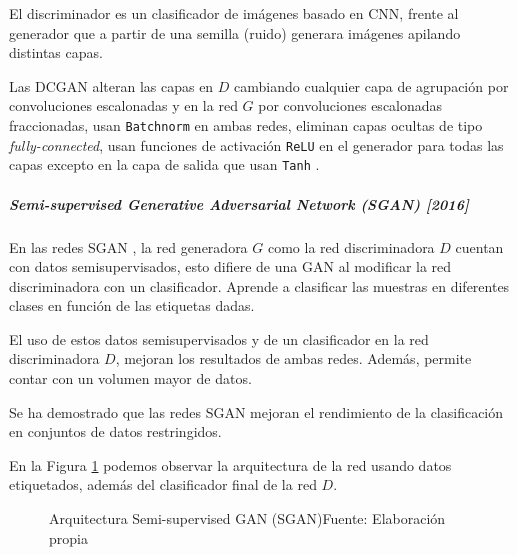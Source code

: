 El discriminador es un clasificador de imágenes basado en \gls{CNN}, frente al generador que a partir de una semilla (ruido) generara imágenes apilando distintas capas.

Las \gls{DCGAN} alteran las capas en ${D}$ cambiando cualquier capa de agrupación por convoluciones escalonadas y en la red ${G}$ por convoluciones escalonadas fraccionadas, usan \texttt{Batchnorm} en ambas  redes, eliminan capas ocultas de tipo \textit{fully-connected}, usan funciones de activación \texttt{ReLU} en el  generador para todas las capas excepto en la capa de salida que usan \texttt{Tanh} \cite{ibm-gradient-descent}.


\subparagraph*{Semi-supervised Generative Adversarial Network (SGAN) [2016]}
En las redes \gls{SGAN} \cite{SGAN-odena2016semisupervised}, la red generadora ${G}$ como la red discriminadora ${D}$ cuentan con datos semisupervisados, esto difiere de una \gls{GAN} al modificar la red discriminadora con un clasificador. Aprende a clasificar las muestras en diferentes clases en función de las etiquetas dadas.

El uso de estos datos semisupervisados y de un clasificador en la red discriminadora ${D}$, mejoran los resultados de ambas redes. Además, permite contar con un volumen mayor de datos.

Se ha demostrado que las redes \gls{SGAN} mejoran el rendimiento de la clasificación en conjuntos de datos restringidos.

En la Figura \ref{fig:SGAN} podemos observar la arquitectura de la red usando datos etiquetados, además del clasificador final de la red ${D}$.

\begin{figure}[H]
    \centering
    \centerline{}
    \caption{Arquitectura Semi-supervised GAN ({SGAN})\newline{}Fuente: Elaboración propia}
    \label{fig:SGAN}
\end{figure}


